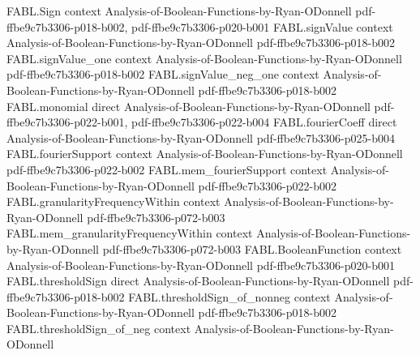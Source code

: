 \begin{theorem}
\label{FABL.sheppardsFormula}
\leanok
{}
\proofstep
  {FABL.Sign}
  {context}
  {Analysis-of-Boolean-Functions-by-Ryan-ODonnell}
  {pdf-ffbe9c7b3306-p018-b002,
    pdf-ffbe9c7b3306-p020-b001}
\proofstep
  {FABL.signValue}
  {context}
  {Analysis-of-Boolean-Functions-by-Ryan-ODonnell}
  {pdf-ffbe9c7b3306-p018-b002}
\proofstep
  {FABL.signValue_one}
  {context}
  {Analysis-of-Boolean-Functions-by-Ryan-ODonnell}
  {pdf-ffbe9c7b3306-p018-b002}
\proofstep
  {FABL.signValue_neg_one}
  {context}
  {Analysis-of-Boolean-Functions-by-Ryan-ODonnell}
  {pdf-ffbe9c7b3306-p018-b002}
\proofstep
  {FABL.monomial}
  {direct}
  {Analysis-of-Boolean-Functions-by-Ryan-ODonnell}
  {pdf-ffbe9c7b3306-p022-b001,
    pdf-ffbe9c7b3306-p022-b004}
\proofstep
  {FABL.fourierCoeff}
  {direct}
  {Analysis-of-Boolean-Functions-by-Ryan-ODonnell}
  {pdf-ffbe9c7b3306-p025-b004}
\proofstep
  {FABL.fourierSupport}
  {context}
  {Analysis-of-Boolean-Functions-by-Ryan-ODonnell}
  {pdf-ffbe9c7b3306-p022-b002}
\proofstep
  {FABL.mem_fourierSupport}
  {context}
  {Analysis-of-Boolean-Functions-by-Ryan-ODonnell}
  {pdf-ffbe9c7b3306-p022-b002}
\proofstep
  {FABL.granularityFrequencyWithin}
  {context}
  {Analysis-of-Boolean-Functions-by-Ryan-ODonnell}
  {pdf-ffbe9c7b3306-p072-b003}
\proofstep
  {FABL.mem_granularityFrequencyWithin}
  {context}
  {Analysis-of-Boolean-Functions-by-Ryan-ODonnell}
  {pdf-ffbe9c7b3306-p072-b003}
\proofstep
  {FABL.BooleanFunction}
  {context}
  {Analysis-of-Boolean-Functions-by-Ryan-ODonnell}
  {pdf-ffbe9c7b3306-p020-b001}
\proofstep
  {FABL.thresholdSign}
  {direct}
  {Analysis-of-Boolean-Functions-by-Ryan-ODonnell}
  {pdf-ffbe9c7b3306-p018-b002}
\proofstep
  {FABL.thresholdSign_of_nonneg}
  {context}
  {Analysis-of-Boolean-Functions-by-Ryan-ODonnell}
  {pdf-ffbe9c7b3306-p018-b002}
\proofstep
  {FABL.thresholdSign_of_neg}
  {context}
  {Analysis-of-Boolean-Functions-by-Ryan-ODonnell}

\end{theorem}
